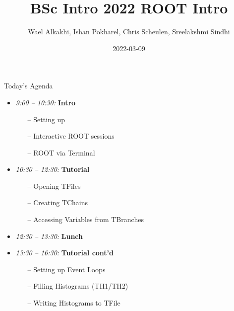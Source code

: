 \documentclass[10pt, aspectratio=169]{beamer}
\title{\Large\color{ugoelogodark} BSc Intro 2022 ROOT Intro}
\author[]{Wael Alkakhi, Ishan Pokharel, Chris Scheulen, Sreelakshmi Sindhi}
\institute[Univ. of G\"ottingen]{II.~Physikalisches Institut, Georg-August-Universit\"at G\"ottingen}
\date{2022-03-09}
\begin{document}
\begin{frame}
  \titlepage
\end{frame}

\begin{frame}{Today's Agenda}

  \begin{itemize}
    \item
      \emph{9:00 -- 10:30:} \textbf{Intro}
    \begin{itemize}
      \item[--] Setting up
      \item[--] Interactive ROOT sessions
      \item[--] ROOT via Terminal
    \end{itemize}
    \item
      \emph{10:30 -- 12:30:} \textbf{Tutorial}
    \begin{itemize}
      \item[--] Opening TFiles
      \item[--] Creating TChains
      \item[--] Accessing Variables from TBranches
    \end{itemize}
    \item
      \emph{12:30 -- 13:30:} \textbf{Lunch}
    \item
      \emph{13:30 -- 16:30:} \textbf{Tutorial cont'd}
    \begin{itemize}
      \item[--] Setting up Event Loops
      \item[--] Filling Histograms (TH1/TH2)
      \item[--] Writing Histograms to TFile
    \end{itemize}
  \end{itemize}
\end{frame}
\end{document}

